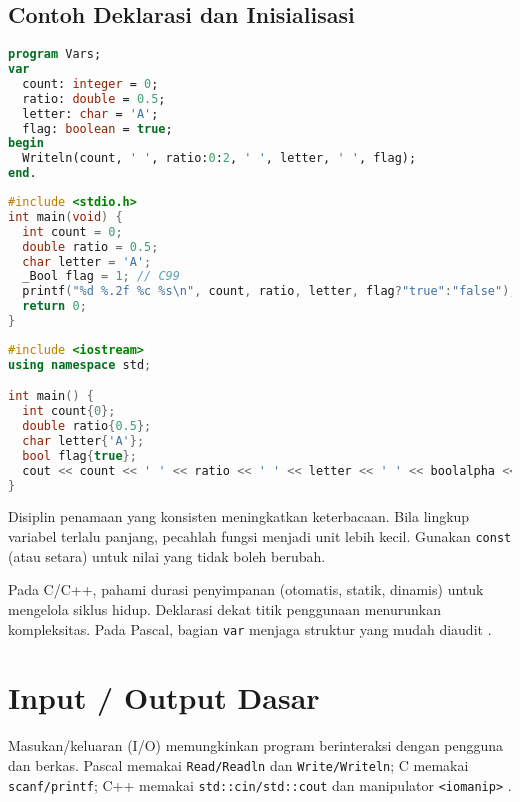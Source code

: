 \documentclass[../main.tex]{subfiles}
\begin{document}
\subsection{Contoh Deklarasi dan Inisialisasi}
\begin{lstlisting}[language=Pascal, caption={Deklarasi dan inisialisasi di Pascal}]
program Vars;
var
  count: integer = 0;
  ratio: double = 0.5;
  letter: char = 'A';
  flag: boolean = true;
begin
  Writeln(count, ' ', ratio:0:2, ' ', letter, ' ', flag);
end.
\end{lstlisting}

\begin{lstlisting}[language=C, caption={Deklarasi dan inisialisasi di C}]
#include <stdio.h>
int main(void) {
  int count = 0;
  double ratio = 0.5;
  char letter = 'A';
  _Bool flag = 1; // C99
  printf("%d %.2f %c %s\n", count, ratio, letter, flag?"true":"false");
  return 0;
}
\end{lstlisting}

\begin{lstlisting}[language=C++, caption={Deklarasi dan inisialisasi di C++}]
#include <iostream>
using namespace std;

int main() {
  int count{0};
  double ratio{0.5};
  char letter{'A'};
  bool flag{true};
  cout << count << ' ' << ratio << ' ' << letter << ' ' << boolalpha << flag << '\n';
}
\end{lstlisting}

Disiplin penamaan yang konsisten meningkatkan keterbacaan. Bila lingkup variabel terlalu panjang, pecahlah fungsi menjadi unit lebih kecil. Gunakan \texttt{const} (atau setara) untuk nilai yang tidak boleh berubah.

Pada C/C++, pahami durasi penyimpanan (otomatis, statik, dinamis) untuk mengelola siklus hidup. Deklarasi dekat titik penggunaan menurunkan kompleksitas. Pada Pascal, bagian \texttt{var} menjaga struktur yang mudah diaudit \parencite{free-pascal-docs,gnu-c-manual}.

\section{Input / Output Dasar}
Masukan/keluaran (I/O) memungkinkan program berinteraksi dengan pengguna dan berkas. Pascal memakai \texttt{Read/Readln} dan \texttt{Write/Writeln}; C memakai \texttt{scanf/printf}; C++ memakai \texttt{std::cin/std::cout} dan manipulator \texttt{\textless iomanip\textgreater} \parencite{w3pascal-io,gnu-c-manual,cplusplus-io,cpp-iomanip}.
\end{document}
